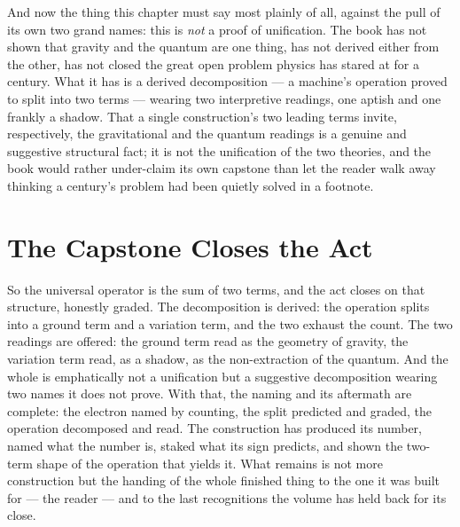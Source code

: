 And now the thing this chapter must say most plainly of all, against the pull of its own two grand names: this is
\emph{not} a proof of unification. The book has not shown that gravity and the quantum are one thing, has not
derived either from the other, has not closed the great open problem physics has stared at for a century. What it
has is a derived decomposition --- a machine's operation proved to split into two terms --- wearing two
interpretive readings, one aptish and one frankly a shadow. That a single construction's two leading terms invite,
respectively, the gravitational and the quantum readings is a genuine and suggestive structural fact; it is not
the unification of the two theories, and the book would rather under-claim its own capstone than let the reader
walk away thinking a century's problem had been quietly solved in a footnote.

\section{The Capstone Closes the Act}

So the universal operator is the sum of two terms, and the act closes on that structure, honestly graded. The
decomposition is derived: the operation splits into a ground term and a variation term, and the two exhaust the
count. The two readings are offered: the ground term read as the geometry of gravity, the variation term read, as
a shadow, as the non-extraction of the quantum. And the whole is emphatically not a unification but a suggestive
decomposition wearing two names it does not prove. With that, the naming and its aftermath are complete: the
electron named by counting, the split predicted and graded, the operation decomposed and read. The construction
has produced its number, named what the number is, staked what its sign predicts, and shown the two-term shape of
the operation that yields it. What remains is not more construction but the handing of the whole finished thing to
the one it was built for --- the reader --- and to the last recognitions the volume has held back for its close.
